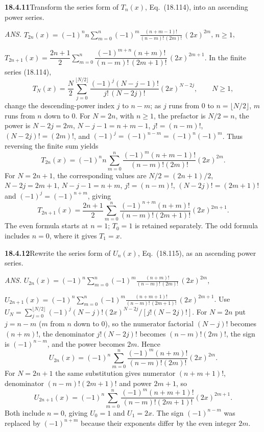\par\bigskip
\noindent\textbf{18.4.11}\quad Transform the series form of
$T_{n}(x)$, Eq.~(18.114), into an ascending power series.
\par\nobreak\hfill\emph{ANS.}\enspace
$T_{2n}(x)=(-1)^{n}n\displaystyle\sum_{m=0}^{n}
(-1)^{m}\frac{(n+m-1)!}{(n-m)!\,(2m)!}\,(2x)^{2m}$,
$n\ge1$,\par\nobreak
\hfill$T_{2n+1}(x)=\dfrac{2n+1}{2}\displaystyle\sum_{m=0}^{n}
\dfrac{(-1)^{m+n}(n+m)!}{(n-m)!\,(2m+1)!}\,(2x)^{2m+1}$.
\solution
In the finite series (18.114),
\[
T_N(x)=\frac N2\sum_{j=0}^{\lfloor N/2\rfloor}
 \frac{(-1)^j(N-j-1)!}{j!\,(N-2j)!}(2x)^{N-2j},\qquad N\ge1,
\]
change the descending-power index $j$ to $n-m$; as $j$ runs from
$0$ to $n=\lfloor N/2\rfloor$, $m$ runs from $n$ down to $0$.
For $N=2n$, with $n\ge1$, the prefactor is $N/2=n$, the power is
$N-2j=2m$, $N-j-1=n+m-1$, $j!=(n-m)!$, $(N-2j)!=(2m)!$, and
$(-1)^j=(-1)^{n-m}=(-1)^n(-1)^m$.
Thus reversing the finite sum yields
\[
\boxed{T_{2n}(x)=(-1)^nn\sum_{m=0}^n
 \frac{(-1)^m(n+m-1)!}{(n-m)!(2m)!}(2x)^{2m}}.
\]
For $N=2n+1$, the corresponding values are $N/2=(2n+1)/2$,
$N-2j=2m+1$, $N-j-1=n+m$, $j!=(n-m)!$, $(N-2j)!=(2m+1)!$ and
$(-1)^j=(-1)^{n+m}$, giving
\[
\boxed{T_{2n+1}(x)=\frac{2n+1}{2}\sum_{m=0}^n
 \frac{(-1)^{n+m}(n+m)!}{(n-m)!(2m+1)!}(2x)^{2m+1}}.
\]
The even formula starts at $n=1$; $T_0=1$ is retained separately.
The odd formula includes $n=0$, where it gives $T_1=x$.

\par\bigskip
\noindent\textbf{18.4.12}\quad Rewrite the series form of $U_{n}(x)$,
Eq.~(18.115), as an ascending power series.
\par\nobreak\hfill\emph{ANS.}\enspace
$U_{2n}(x)=(-1)^{n}\displaystyle\sum_{m=0}^{n}
(-1)^{m}\frac{(n+m)!}{(n-m)!\,(2m)!}\,(2x)^{2m}$,\par\nobreak
\hfill$U_{2n+1}(x)=(-1)^{n}\displaystyle\sum_{m=0}^{n}
(-1)^{m}\frac{(n+m+1)!}{(n-m)!\,(2m+1)!}\,(2x)^{2m+1}$.
\solution
Use
$U_N=\sum_{j=0}^{\lfloor N/2\rfloor}
(-1)^j(N-j)!(2x)^{N-2j}/[j!(N-2j)!]$.
For $N=2n$ put $j=n-m$ ($m$ from $n$ down to $0$), so the numerator
factorial $(N-j)!$ becomes $(n+m)!$, the denominator $j!(N-2j)!$
becomes $(n-m)!(2m)!$, the sign is $(-1)^{n-m}$, and the power becomes
$2m$.  Hence
\[
\boxed{U_{2n}(x)=(-1)^n\sum_{m=0}^n
 \frac{(-1)^m(n+m)!}{(n-m)!(2m)!}(2x)^{2m}}.
\]
For $N=2n+1$ the same substitution gives numerator $(n+m+1)!$,
denominator $(n-m)!(2m+1)!$ and power $2m+1$, so
\[
\boxed{U_{2n+1}(x)=(-1)^n\sum_{m=0}^n
 \frac{(-1)^m(n+m+1)!}{(n-m)!(2m+1)!}(2x)^{2m+1}}.
\]
Both include $n=0$, giving $U_0=1$ and $U_1=2x$.  The sign
$(-1)^{n-m}$ was replaced by $(-1)^{n+m}$ because their exponents
differ by the even integer $2m$.

